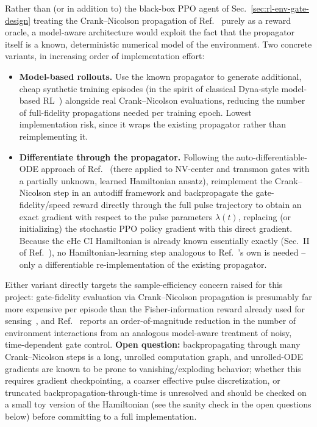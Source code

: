 \documentclass[aps,prapplied,reprint,superscriptaddress,longbibliography]{revtex4-2}
\begin{document}
Rather than (or in addition to) the black-box PPO agent of Sec.~\ref{sec:rl-env-gate-design}
treating the Crank--Nicolson propagation of Ref.~\cite{leinonen2025} purely as a reward oracle, a
model-aware architecture would exploit the fact that the propagator itself is a known, deterministic
numerical model of the environment. Two concrete variants, in increasing order of implementation
effort:
\begin{itemize}
  \item \textbf{Model-based rollouts.} Use the known propagator to generate additional, cheap
  synthetic training episodes (in the spirit of classical Dyna-style model-based
  RL~\cite{moerland2023modelbased}) alongside real Crank--Nicolson evaluations, reducing the number
  of full-fidelity propagations needed per training epoch. Lowest implementation risk, since it wraps
  the existing propagator rather than reimplementing it.
  \item \textbf{Differentiate through the propagator.} Following the auto-differentiable-ODE approach
  of Ref.~\cite{khalid2023samplemodelbased} (there applied to NV-center and transmon gates with a
  partially unknown, learned Hamiltonian ansatz), reimplement the Crank--Nicolson step in an autodiff
  framework and backpropagate the gate-fidelity/speed reward directly through the full pulse
  trajectory to obtain an exact gradient with respect to the pulse parameters $\lambda(t)$, replacing
  (or initializing) the stochastic PPO policy gradient with this direct gradient. Because the eHe CI
  Hamiltonian is already known essentially exactly (Sec.~II of Ref.~\cite{beysengulov2024}), no
  Hamiltonian-learning step analogous to Ref.~\cite{khalid2023samplemodelbased}'s own is needed --
  only a differentiable re-implementation of the existing propagator.
\end{itemize}
Either variant directly targets the sample-efficiency concern raised for this project: gate-fidelity
evaluation via Crank--Nicolson propagation is presumably far more expensive per episode than the
Fisher-information reward already used for sensing~\cite{perruzza2026}, and
Ref.~\cite{khalid2023samplemodelbased} reports an order-of-magnitude reduction in the number of
environment interactions from an analogous model-aware treatment of noisy, time-dependent gate
control. \textbf{Open question:} backpropagating through many Crank--Nicolson steps is a long,
unrolled computation graph, and unrolled-ODE gradients are known to be prone to vanishing/exploding
behavior; whether this requires gradient checkpointing, a coarser effective pulse discretization, or
truncated backpropagation-through-time is unresolved and should be checked on a small toy version of
the Hamiltonian (see the sanity check in the open questions below) before committing to a full
implementation.
\end{document}
